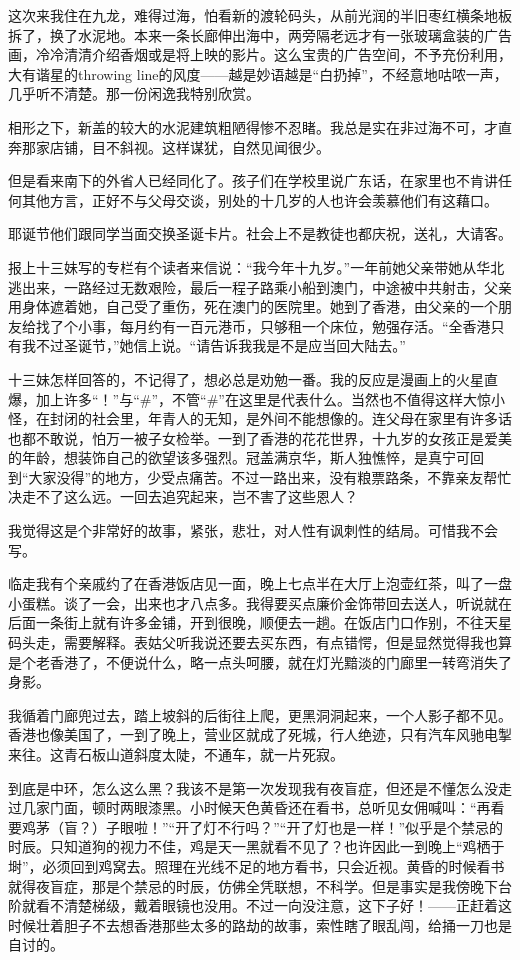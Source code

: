 \par 这次来我住在九龙，难得过海，怕看新的渡轮码头，从前光润的半旧枣红横条地板拆了，换了水泥地。本来一条长廊伸出海中，两旁隔老远才有一张玻璃盒装的广告画，冷冷清清介绍香烟或是将上映的影片。这么宝贵的广告空间，不予充份利用，大有谐星的throwing line的风度——越是妙语越是“白扔掉”，不经意地咕哝一声，几乎听不清楚。那一份闲逸我特别欣赏。
\par 相形之下，新盖的较大的水泥建筑粗陋得惨不忍睹。我总是实在非过海不可，才直奔那家店铺，目不斜视。这样谋犹，自然见闻很少。
\par 但是看来南下的外省人已经同化了。孩子们在学校里说广东话，在家里也不肯讲任何其他方言，正好不与父母交谈，别处的十几岁的人也许会羡慕他们有这藉口。
\par 耶诞节他们跟同学当面交换圣诞卡片。社会上不是教徒也都庆祝，送礼，大请客。
\par 报上十三妹写的专栏有个读者来信说：“我今年十九岁。”一年前她父亲带她从华北逃出来，一路经过无数艰险，最后一程子路乘小船到澳门，中途被中共射击，父亲用身体遮着她，自己受了重伤，死在澳门的医院里。她到了香港，由父亲的一个朋友给找了个小事，每月约有一百元港币，只够租一个床位，勉强存活。“全香港只有我不过圣诞节，”她信上说。“请告诉我我是不是应当回大陆去。”
\par 十三妹怎样回答的，不记得了，想必总是劝勉一番。我的反应是漫画上的火星直爆，加上许多“！”与“\#”，不管“\#”在这里是代表什么。当然也不值得这样大惊小怪，在封闭的社会里，年青人的无知，是外间不能想像的。连父母在家里有许多话也都不敢说，怕万一被子女检举。一到了香港的花花世界，十九岁的女孩正是爱美的年龄，想装饰自己的欲望该多强烈。冠盖满京华，斯人独憔悴，是真宁可回到“大家没得”的地方，少受点痛苦。不过一路出来，没有粮票路条，不靠亲友帮忙决走不了这么远。一回去追究起来，岂不害了这些恩人？
\par 我觉得这是个非常好的故事，紧张，悲壮，对人性有讽刺性的结局。可惜我不会写。
\par 临走我有个亲戚约了在香港饭店见一面，晚上七点半在大厅上泡壶红茶，叫了一盘小蛋糕。谈了一会，出来也才八点多。我得要买点廉价金饰带回去送人，听说就在后面一条街上就有许多金铺，开到很晚，顺便去一趟。在饭店门口作别，不往天星码头走，需要解释。表姑父听我说还要去买东西，有点错愕，但是显然觉得我也算是个老香港了，不便说什么，略一点头呵腰，就在灯光黯淡的门廊里一转弯消失了身影。
\par 我循着门廊兜过去，踏上坡斜的后街往上爬，更黑洞洞起来，一个人影子都不见。香港也像美国了，一到了晚上，营业区就成了死城，行人绝迹，只有汽车风驰电掣来往。这青石板山道斜度太陡，不通车，就一片死寂。
\par 到底是中环，怎么这么黑？我该不是第一次发现我有夜盲症，但还是不懂怎么没走过几家门面，顿时两眼漆黑。小时候天色黄昏还在看书，总听见女佣喊叫：“再看要鸡茅（盲？）子眼啦！”“开了灯不行吗？”“开了灯也是一样！”似乎是个禁忌的时辰。只知道狗的视力不佳，鸡是天一黑就看不见了？也许因此一到晚上“鸡栖于埘”，必须回到鸡窝去。照理在光线不足的地方看书，只会近视。黄昏的时候看书就得夜盲症，那是个禁忌的时辰，仿佛全凭联想，不科学。但是事实是我傍晚下台阶就看不清楚梯级，戴着眼镜也没用。不过一向没注意，这下子好！——正赶着这时候壮着胆子不去想香港那些太多的路劫的故事，索性瞎了眼乱闯，给捅一刀也是自讨的。
